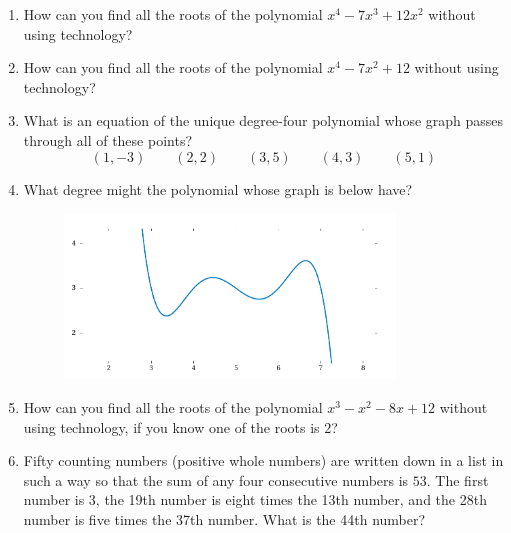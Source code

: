 \begin{enumerate}

    \item 
        How can you find all the roots of
        the polynomial \( x^4-7x^3+12x^2 \)
        without using technology?
        \vfill\null

    \item 
        How can you find all the roots of
        the polynomial \( x^4-7x^2+12 \)
        without using technology?
        \vfill\null

    \item 
        What is an equation of the unique degree-four polynomial
        whose graph passes through all of these points?
        \[ (1,-3) \qquad (2,2) \qquad (3,5) \qquad (4,3) \qquad (5,1) \]
        \vfill\null

        \newpage


    \item 
        What degree might the polynomial whose graph is below have?
        \par\begin{figure}[h]
            \centering \includegraphics[width=0.83\textwidth]{figures/poly/main.pdf}
        \end{figure}

    \item 
        How can you find all the roots of
        the polynomial \( x^3-x^2-8x+12\)
        without using technology,
        if you know one of the roots is \(2\)?
        \vfill\null
        \vfill\null

    \item 
        Fifty counting numbers (positive whole numbers) are written down in a list
        in such a way so that the sum of any four consecutive numbers is \(53\). 
    The first number is \(3\), the 19th number is eight times the 13th number, 
    and the 28th number is five times the 37th number. What is the 44th number?

\end{enumerate}



